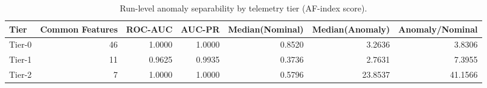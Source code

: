 \begin{table}[t]
\centering
\caption{Run-level anomaly separability by telemetry tier (AF-index score).}
\label{tab:dice_overall_metrics}
\footnotesize
\begin{tabular}{lrrrrrr}
\toprule
Tier & Common Features & ROC-AUC & AUC-PR & Median(Nominal) & Median(Anomaly) & Anomaly/Nominal \\
\midrule
Tier-0 & 46 & 1.0000 & 1.0000 & 0.8520 & 3.2636 & 3.8306 \\
Tier-1 & 11 & 0.9625 & 0.9935 & 0.3736 & 2.7631 & 7.3955 \\
Tier-2 & 7 & 1.0000 & 1.0000 & 0.5796 & 23.8537 & 41.1566 \\
\bottomrule
\end{tabular}

\end{table}
